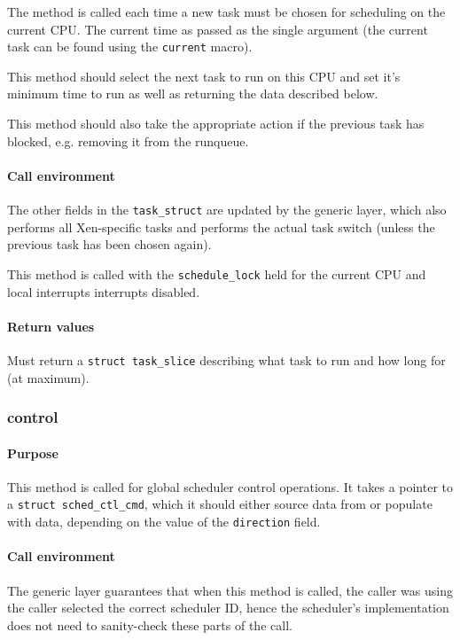\documentclass[11pt,twoside,final,openright]{xenstyle}
\begin{document}
The method is called each time a new task must be chosen for scheduling on the
current CPU.  The current time as passed as the single argument (the current
task can be found using the {\tt current} macro).

This method should select the next task to run on this CPU and set it's minimum
time to run as well as returning the data described below.

This method should also take the appropriate action if the previous
task has blocked, e.g. removing it from the runqueue.

\paragraph*{Call environment}

The other fields in the {\tt task\_struct} are updated by the generic layer,
which also performs all Xen-specific tasks and performs the actual task switch
(unless the previous task has been chosen again).

This method is called with the {\tt schedule\_lock} held for the current CPU
and local interrupts interrupts disabled.

\paragraph*{Return values}

Must return a {\tt struct task\_slice} describing what task to run and how long
for (at maximum).

\subsubsection{control}

\paragraph*{Purpose}

This method is called for global scheduler control operations.  It takes a
pointer to a {\tt struct sched\_ctl\_cmd}, which it should either
source data from or populate with data, depending on the value of the
{\tt direction} field.

\paragraph*{Call environment}

The generic layer guarantees that when this method is called, the
caller was using the caller selected the correct scheduler ID, hence
the scheduler's implementation does not need to sanity-check these
parts of the call.
\end{document}

